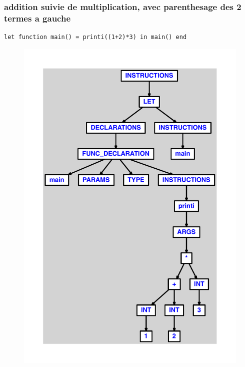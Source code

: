 \documentclass{article}
\begin{document}
\subsubsection{addition suivie de multiplication, avec parenthesage des 2 termes a gauche}
\begin{lstlisting}
let function main() = printi((1+2)*3) in main() end
\end{lstlisting}
\newpage
\begin{figure}[H]
\centering
\includegraphics[max width=\textwidth]{ast/ast_97.pdf}
\end{figure}
\newpage
\end{document}
